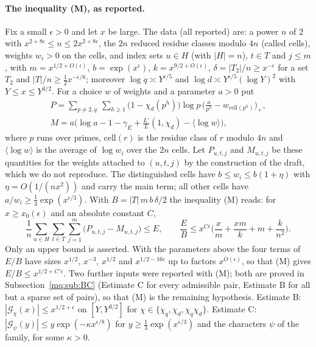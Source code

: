 \paragraph{The inequality (M), as reported.} Fix a small $\epsilon>0$ and let $x$ be large. The data (all reported) are: a power $n$ of $2$ with $x^{2+8\epsilon}\le n\le2x^{2+8\epsilon}$, the $2n$ reduced residue classes modulo $4n$ (called cells), weights $w_i>0$ on the cells, and index sets $u\in H$ (with $|H|=n$), $t\in T$ and $j\le m$, with $m=x^{1/2+O(\epsilon)}$, $b=\exp(x^\epsilon)$, $k=x^{9/2+O(\epsilon)}$, $\delta=|T_2|/n\ge x^{-\epsilon}$ for a set $T_2$ and $|T|/n\ge\frac12x^{-\epsilon/8}$; moreover $\log q\asymp Y^{\epsilon/5}$ and $\log d\asymp Y^{\epsilon/5}(\log Y)^2$ with $Y\le x\le Y^{3/2}$. For a choice $w$ of weights and a parameter $a>0$ put
\begin{gather*}
P=\sum_{p\ne2,q}\ \sum_{h\ge1}\big(1-\chi_d(p^h)\big)\log p\,\Big(\frac a{p^h}-w_{\mathrm{cell}(p^h)}\Big)_+,\\ M=a\Big(\log a-1-\gamma_E+\frac{L'}{L}(1,\chi_d)-\langle\log w\rangle\Big),
\end{gather*}
where $p$ runs over primes, $\mathrm{cell}(r)$ is the residue class of $r$ modulo $4n$ and $\langle\log w\rangle$ is the average of $\log w_i$ over the $2n$ cells. Let $P_{u,t,j}$ and $M_{u,t,j}$ be these quantities for the weights attached to $(u,t,j)$ by the construction of the draft, which we do not reproduce. The distinguished cells have $b\le w_i\le b(1+\eta)$ with $\eta=O(1/(nx^2))$ and carry the main term; all other cells have $a/w_i\ge\frac13\exp(x^{\epsilon/3})$. With $B=|T|\,m\,b\,\delta/2$ the inequality (M) reads: for $x\ge x_0(\epsilon)$ and an absolute constant $C$,
\begin{equation}\label{mq:eq:M}
\frac1n\sum_{u\in H}\sum_{t\in T}\sum_{j=1}^m\big(P_{u,t,j}-M_{u,t,j}\big)\le E,\qquad\frac EB\le x^{C\epsilon}\Big(\frac xm+\frac{xm}k+m+\frac k{n^2}\Big).
\end{equation}
Only an upper bound is asserted. With the parameters above the four terms of $E/B$ have sizes $x^{1/2}$, $x^{-3}$, $x^{1/2}$ and $x^{1/2-16\epsilon}$ up to factors $x^{O(\epsilon)}$, so that (M) gives $E/B\le x^{1/2+C'\epsilon}$. Two further inputs were reported with (M); both are proved in Subsection~\ref{mq:sub:BC} (Estimate C for every admissible pair, Estimate B for all but a sparse set of pairs), so that (M) is the remaining hypothesis. Estimate B: $|\mathcal G_\chi(x)|\le x^{1/2+\epsilon}$ on $[Y,Y^{3/2}]$ for $\chi\in\{\chi_q,\chi_d,\chi_q\chi_d\}$. Estimate C: $|\mathcal G_\psi(y)|\le y\exp(-\kappa x^{\epsilon/8})$ for $y\ge\frac13\exp(x^{\epsilon/3})$ and the characters $\psi$ of the family, for some $\kappa>0$.

